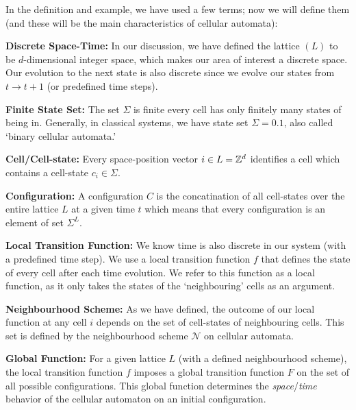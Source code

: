 \documentclass[11pt, oneside]{scrbook}
\begin{document}
In the definition and example, we have used a few terms; now we will define them (and these will be the main characteristics of cellular automata):
\begin{list}{}{}
    \item[\bfseries Discrete Space-Time:] In our discussion, we have defined the lattice \((L)\) to be \(d\)-dimensional integer space, which makes our area of interest a discrete space. Our evolution to the next state is also discrete since we evolve our states from \(t \to t+1\) (or predefined time steps).

    \item[\bfseries Finite State Set:] The set \(\Sigma\) is finite \ie every cell has only finitely many states of being in. Generally, in classical systems, we have state set \(\Sigma = \qty{0, 1}\), also called `binary cellular automata.'

    \item[\bfseries Cell/Cell-state:] Every space-position vector \(i \in L = \mathbb Z^d\) identifies a cell which contains a cell-state \(c_i \in \Sigma\).

    \item[\bfseries Configuration:] A configuration \(C\) is the concatination of all cell-states over the entire lattice \(L\) at a given time \(t\) which means that every configuration is an element of set \(\Sigma^L\).

    \item[\bfseries Local Transition Function:] We know time is also discrete in our system (with a predefined time step). We use a local transition function \(f\) that defines the state of every cell after each time evolution. We refer to this function as a local function, as it only takes the states of the `neighbouring' cells as an argument.

    \item[\bfseries Neighbourhood Scheme:] As we have defined, the outcome of our local function at any cell \(i\) depends on the set of cell-states of neighbouring cells. This set is defined by the neighbourhood scheme \(\mathcal{N}\) on cellular automata.

    \item[\bfseries Global Function:] For a given lattice \(L\) (with a defined neighbourhood scheme), the local transition function \(f\) imposes a global transition function \(F\) on the set of all possible configurations. This global function determines the \emph{space}/\emph{time} behavior of the cellular automaton on an initial configuration.
\end{list}
\end{document}
